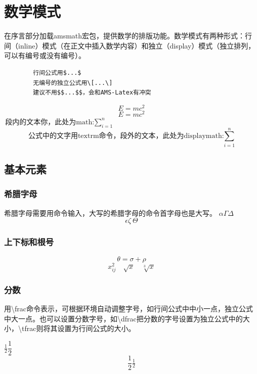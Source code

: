 \documentclass[16pt]{article}
\begin{document}
\section{数学模式}
在序言部分加载amsmath宏包，提供数学的排版功能。数学模式有两种形式：行间（inline）模式（在正文中插入数学内容）和独立（display）模式（独立排列，可以有编号或没有编号）。 \par
    \begin{lstlisting}
        行间公式用$...$
        无编号的独立公式用\[...\]
        建议不用$$...$$，会和AMS-Latex有冲突
    \end{lstlisting}

    \[ \boxed{E=mc^2} \]
    \begin{equation}
        E=mc^2
    \end{equation}
    \begin{math}
        \textrm{段内的文本你，此处为math:}\sum\limits_{i=1}^n
    \end{math}
    \begin{displaymath}
        \textrm{公式中的文字用textrm命令，段外的文本，此处为displaymath:}\sum\limits_{i=1}^n
    \end{displaymath}

\subsection{基本元素}
\subsubsection{希腊字母}
希腊字母需要用命令输入，大写的希腊字母的命令首字母也是大写。
$\alpha \Gamma \Delta $
\[\epsilon \zeta\ \Theta\]

\subsubsection{上下标和根号}
    \begin{equation}
        \theta = \sigma + \rho
    \end{equation}
    \[x_{ij}^2\quad \sqrt{x}\quad \sqrt[3]{x} \]
\subsubsection{分数}
    用\textbackslash frac命令表示，可根据环境自动调整字号，如行间公式中中小一点，独立公式中大一点。也可以设置分数字号，如\textbackslash dfrac把分数的字号设置为独立公式中的大小，\textbackslash tfrac则将其设置为行间公式的大小。\par
    $\frac{1}{2}  \dfrac{1}{2}$
    \[\frac{1}{2}
    \tfrac{1}{2}\]
\end{document}
